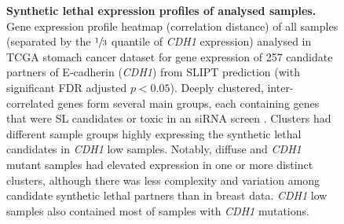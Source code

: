 \begin{figure}[!ht]
  \centering
    \caption[Synthetic lethal expression profiles of stomach samples]{\small \textbf{Synthetic lethal expression profiles of analysed samples.} Gene expression profile heatmap (correlation distance) of all samples (separated by the $\sfrac{1}{3}$ quantile of \textit{CDH1} expression) analysed in \gls{TCGA} stomach cancer dataset for gene expression of 257 candidate partners of \gls{E-cadherin} (\textit{CDH1}) from \gls{SLIPT} prediction (with significant \gls{FDR} adjusted $p < 0.05$). Deeply clustered, inter-correlated genes form several main groups, each containing genes that were SL candidates or toxic in an \gls{siRNA} screen \citep{Telford2015}. Clusters had different sample groups highly expressing the synthetic lethal candidates in \textit{CDH1} low samples. Notably, diffuse and \textit{CDH1} mutant samples had elevated expression in one or more distinct clusters, although there was less complexity and variation among candidate synthetic lethal partners than in breast data. \textit{CDH1} low samples also contained most of samples with \textit{CDH1} mutations.
}
\label{fig:slipt_expr_stad_mtSL}
\end{figure}

